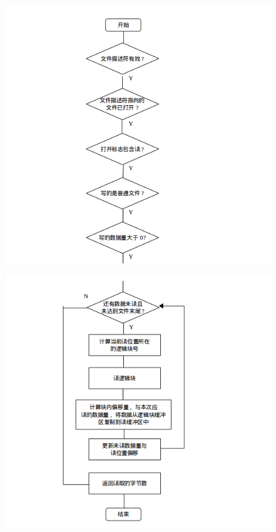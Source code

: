 \documentclass[nofonts]{ctexart}
\begin{document}
\begin{itemize}
  \includegraphics[width=12cm]{./images/./read_1.png}

  \includegraphics[width=12cm]{./images/./read_2.png}
  \end{itemize}
\end{document}
